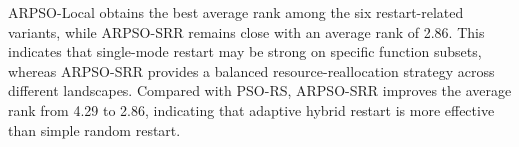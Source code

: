 ARPSO-Local obtains the best average rank among the six restart-related variants, while ARPSO-SRR
remains close with an average rank of 2.86. This indicates that single-mode restart may be strong on
specific function subsets, whereas ARPSO-SRR provides a balanced resource-reallocation strategy
across different landscapes. Compared with PSO-RS, ARPSO-SRR improves the average rank from 4.29 to
2.86, indicating that adaptive hybrid restart is more effective than simple random restart.
